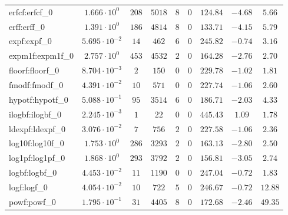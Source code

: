 \begin{tabular}{|l|c|c|c|c|c|c|c|c|}
erfcf:erfcf\_0               & $ 1.666 \cdot 10^{0}  $ & $ 208    $ & $ 5018   $ & $ 8   $ & $ 0   $ & $ 124.84      $ & $ -4.68   $ & $ 5.66    $ \\
erff:erff\_0                 & $ 1.391 \cdot 10^{0}  $ & $ 186    $ & $ 4814   $ & $ 8   $ & $ 0   $ & $ 133.71      $ & $ -4.15   $ & $ 5.79    $ \\
expf:expf\_0                 & $ 5.695 \cdot 10^{-2} $ & $ 14     $ & $ 462    $ & $ 6   $ & $ 0   $ & $ 245.82      $ & $ -0.74   $ & $ 3.16    $ \\
expm1f:expm1f\_0             & $ 2.757 \cdot 10^{0}  $ & $ 453    $ & $ 4532   $ & $ 2   $ & $ 0   $ & $ 164.28      $ & $ -2.76   $ & $ 2.70    $ \\
floorf:floorf\_0             & $ 8.704 \cdot 10^{-3} $ & $ 2      $ & $ 150    $ & $ 0   $ & $ 0   $ & $ 229.78      $ & $ -1.02   $ & $ 1.81    $ \\
fmodf:fmodf\_0               & $ 4.391 \cdot 10^{-2} $ & $ 10     $ & $ 571    $ & $ 0   $ & $ 0   $ & $ 227.74      $ & $ -1.06   $ & $ 2.60    $ \\
hypotf:hypotf\_0             & $ 5.088 \cdot 10^{-1} $ & $ 95     $ & $ 3514   $ & $ 6   $ & $ 0   $ & $ 186.71      $ & $ -2.03   $ & $ 4.33    $ \\
ilogbf:ilogbf\_0             & $ 2.245 \cdot 10^{-3} $ & $ 1      $ & $ 22     $ & $ 0   $ & $ 0   $ & $ 445.43      $ & $ 1.09    $ & $ 1.78    $ \\
ldexpf:ldexpf\_0             & $ 3.076 \cdot 10^{-2} $ & $ 7      $ & $ 756    $ & $ 2   $ & $ 0   $ & $ 227.58      $ & $ -1.06   $ & $ 2.36    $ \\
log10f:log10f\_0             & $ 1.753 \cdot 10^{0}  $ & $ 286    $ & $ 3293   $ & $ 2   $ & $ 0   $ & $ 163.13      $ & $ -2.80   $ & $ 2.50    $ \\
log1pf:log1pf\_0             & $ 1.868 \cdot 10^{0}  $ & $ 293    $ & $ 3792   $ & $ 2   $ & $ 0   $ & $ 156.81      $ & $ -3.05   $ & $ 2.74    $ \\
logbf:logbf\_0               & $ 4.453 \cdot 10^{-2} $ & $ 11     $ & $ 1190   $ & $ 0   $ & $ 0   $ & $ 247.04      $ & $ -0.72   $ & $ 1.83    $ \\
logf:logf\_0                 & $ 4.054 \cdot 10^{-2} $ & $ 10     $ & $ 722    $ & $ 5   $ & $ 0   $ & $ 246.67      $ & $ -0.72   $ & $ 12.88   $ \\
powf:powf\_0                 & $ 1.795 \cdot 10^{-1} $ & $ 31     $ & $ 4405   $ & $ 8   $ & $ 0   $ & $ 172.68      $ & $ -2.46   $ & $ 49.35   $ \\

\end{tabular}
